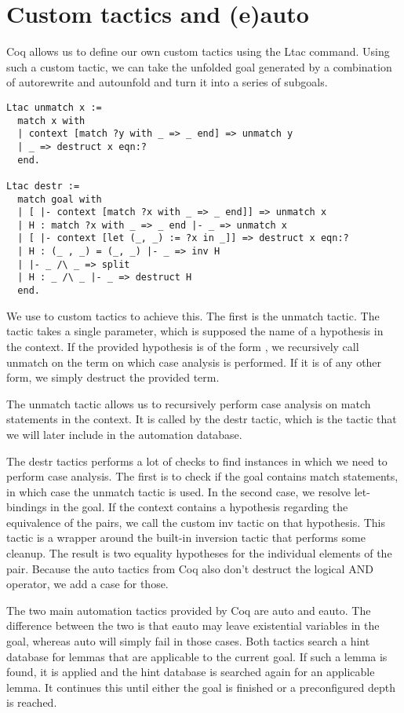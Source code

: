 \section{Custom tactics and (e)auto}
Coq allows us to define our own custom tactics using the Ltac command. Using
such a custom tactic, we can take the unfolded goal generated by a combination 
of autorewrite and autounfold and turn it into a series of subgoals.

\begin{verbatim}
Ltac unmatch x :=
  match x with
  | context [match ?y with _ => _ end] => unmatch y
  | _ => destruct x eqn:?
  end.

Ltac destr :=
  match goal with
  | [ |- context [match ?x with _ => _ end]] => unmatch x
  | H : match ?x with _ => _ end |- _ => unmatch x
  | [ |- context [let (_, _) := ?x in _]] => destruct x eqn:?
  | H : (_ , _) = (_, _) |- _ => inv H
  | |- _ /\ _ => split
  | H : _ /\ _ |- _ => destruct H
  end.
\end{verbatim}

We use to custom tactics to achieve this. The first is the unmatch tactic. The
tactic takes a single parameter, which is supposed the name of a hypothesis in
the context. If the provided hypothesis is of the form , we recursively call unmatch on the term on which case analysis is
performed. If it is of any other form, we simply destruct the provided term. 

The unmatch tactic allows us to recursively perform case analysis on match
statements in the context. It is called by the destr tactic, which is the
tactic that we will later include in the automation database.

The destr tactics performs a lot of checks to find instances in which we need
to perform case analysis. The first is to check if the goal contains match
statements, in which case the unmatch tactic is used. In the second case, we
resolve let-bindings in the goal. If the context contains a hypothesis
regarding the equivalence of the pairs, we call the custom inv tactic on that
hypothesis. This tactic is a wrapper around the built-in inversion tactic that
performs some cleanup. The result is two equality hypotheses for the individual
elements of the pair. Because the auto tactics from Coq also don't destruct the
logical AND operator, we add a case for those.  

The two main automation tactics provided by Coq are auto and eauto. The
difference between the two is that eauto may leave existential variables in the
goal, whereas auto will simply fail in those cases. Both tactics search a hint
database for lemmas that are applicable to the current goal. If such a lemma is
found, it is applied and the hint database is searched again for an applicable
lemma. It continues this until either the goal is finished or a preconfigured
depth is reached.

